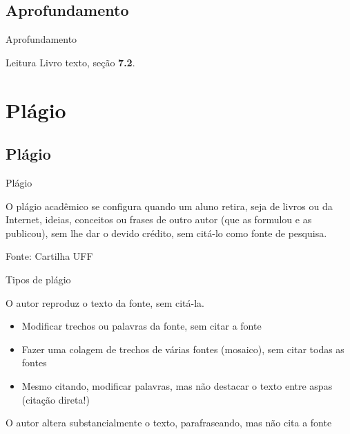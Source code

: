 \documentclass{beamer}
\begin{document}
\subsection{Aprofundamento}

\begin{frame}{Aprofundamento}
  \begin{block}{Leitura}
    Livro texto, seção {\bf 7.2}.
  \end{block}
\end{frame}

\section{Plágio}

\subsection{Plágio}

\begin{frame}{Plágio}
  \begin{definition}
    O plágio acadêmico se configura quando um aluno retira, seja de
    livros ou da Internet, ideias, conceitos ou frases de outro autor
    (que as formulou e as publicou), sem lhe dar o devido crédito, sem
    citá-lo como fonte de pesquisa.
  \end{definition}

  Fonte: Cartilha UFF
\end{frame}

\begin{frame}{Tipos de plágio}
  \begin{definition}
    O autor \alert{reproduz} o texto da fonte, sem citá-la.
  \end{definition}
  \begin{definition}
    \begin{itemize}
    \item Modificar trechos ou palavras da fonte, sem citar a fonte
    \item Fazer uma colagem de trechos de várias fontes (mosaico), sem
      citar \alert{todas} as fontes
    \item \alert{Mesmo citando}, modificar palavras, mas não destacar
      o texto entre aspas (citação direta!)
    \end{itemize}
  \end{definition}
  \begin{definition}
    O autor altera substancialmente o texto, parafraseando, mas não
    cita a fonte
  \end{definition}
\end{frame}
\end{document}
